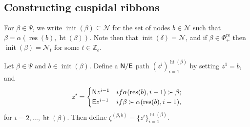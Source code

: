 \documentclass[Unicode,ALCO]{cedram}
\newcommand{\res}{\operatorname{res}}
\newcommand{\height}{\operatorname{ht}}
\newcommand{\Z}{\mathbb{Z}}
\newcommand{\N}{\mathcal{N}}
\newcommand{\0}{{\bar 0}}
\newcommand{\no}{{\sf N}}
\newcommand{\ea}{{\sf E}}
\def\init{{\operatorname{init}}}
\def\height{{\operatorname{ht}}}
\def\height{{\operatorname{ht}}}
\def\re{{\mathrm{re}}}
\begin{document}
 
 \subsection{Constructing cuspidal ribbons}\label{cuspcons}
For \(\beta \in \Psi\), we write \(\init(\beta) \subseteq \N\) for the set of nodes \(b \in \N\) such that \(\beta = \alpha(\res(b), \height(\beta))\). Note then that \(\init(\delta) = \N\), and if \(\beta \in \Phi_+^\re\) then \(\init(\beta) = \N_t\) for some \(t \in \Z_e\).
 

\begin{defi}\label{defxib}
Let \(\beta \in \Psi\) and \(b \in \init(\beta)\). Define a \(\no/\ea\) path \((z^i)_{i=1}^{\height(\beta)}\) by setting \(z^1 = b\), and 
\begin{align*}
z^i = \begin{cases}
\no z^{i-1} & \textup{if } \alpha(\res(b), i-1) \succ \beta;\\
\ea z^{i-1} & \textup{if } \beta \succ \alpha(\res(b), i-1),\\
\end{cases}
\end{align*}
for \(i = 2, \ldots, \height(\beta)\). Then define \(\zeta^{(\beta, b)} = \{z^i\}_{i=1}^{\height(\beta)}\).
\end{defi}
\end{document}
